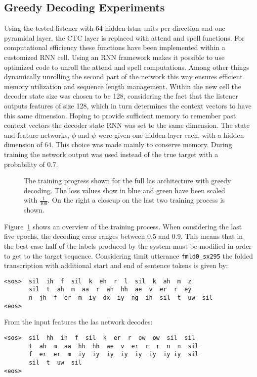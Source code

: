 \subsection{Greedy Decoding Experiments}
Using the tested listener with 64 hidden lstm units per direction and one pyramidal layer, the CTC layer is replaced with attend and spell functions. For computational efficiency these functions have been implemented within a customized RNN cell. Using an RNN framework makes it possible to use optimized code to unroll the attend and spell
computations. Among other things dynamically unrolling the second part of the network this way ensures efficient memory utilization and sequence length management. Within the new cell the decoder state size was chosen to be 128, considering the fact that the listener outputs features of size 128, which in turn determines the context vectors to have this same dimension.  Hoping to provide sufficient memory to remember past context vectors the decoder state RNN was set to the same dimension.
The state and feature networks, $\phi$ and $\psi$ were given one hidden layer each, with a hidden dimension of 64. This choice was made mainly to conserve memory. During training the network output was used instead of the true target with a probability of 0.7.
\begin{figure}


\caption{The training progress shown for the full las architecture with greedy decoding. The loss values show in blue and green have been scaled with $\frac{1}{100}$. On the right a closeup on the last two training process is shown.}
\label{fig:lasGreedy}
\end{figure}
Figure~\ref{fig:lasGreedy} shows an overview of the training process. When considering the last five epochs, the decoding error  ranges between 0.5 and 0.9. This means that in the best case half of the labels produced by the system must be modified in order to
get to the target sequence. Considering timit utterance \texttt{fmld0\_sx295} the folded transcription with additional start and end of sentence tokens is given by:
\begin{lstlisting}[caption={Targets}]
<sos>  sil  ih  f  sil  k  eh  r  l  sil  k  ah  m  z
       sil  t  ah  m  aa  r  ah  hh  ae  v  er  r  ey
       n  jh  f  er  m  iy  dx  iy  ng  ih  sil  t  uw  sil
<eos>
\end{lstlisting}
From the input features the las network decodes:
\begin{lstlisting}[caption={Network output}]
<sos>  sil  hh  ih  f  sil  k  er  r  ow  ow  sil  sil
       t  ah  m  aa  hh  hh  ae  v  er  r  r  n  n  sil
       f  er  er  m  iy  iy  iy  iy  iy  iy  iy iy  sil
       sil  t  uw  sil
<eos>
\end{lstlisting}
